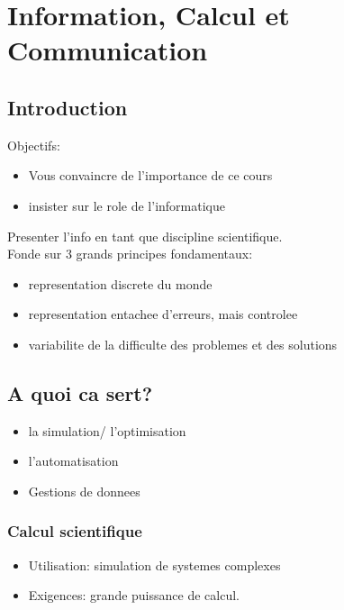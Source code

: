 \documentclass[../main.tex]{subfiles}
\begin{document}
\section{Information, Calcul et Communication}
\subsection{Introduction}

Objectifs:\\
\begin{itemize}
	\item Vous convaincre de l'importance de ce cours\\
	\item insister sur le role de l'informatique
\end{itemize}

Presenter l'info en tant  que discipline scientifique.\\
Fonde sur 3 grands principes fondamentaux:
\begin{itemize}
	\item representation discrete du monde\\
	\item representation entachee d'erreurs, mais controlee\\
	\item variabilite de la difficulte des problemes et des solutions 
\end{itemize}
\subsection{A quoi ca sert?}
\begin{itemize}
	\item la simulation/ l'optimisation\\
	\item l'automatisation\\
	\item Gestions de donnees
\end{itemize}
\subsubsection{Calcul scientifique}
\begin{itemize}
	\item Utilisation: simulation de systemes complexes\\
	\item Exigences: grande puissance de calcul.
\end{itemize}
\end{document}
